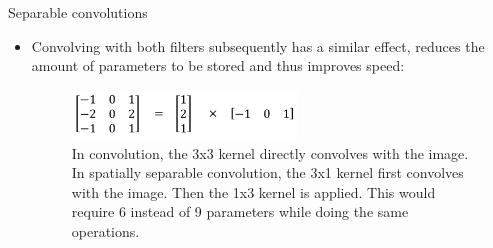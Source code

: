 \begin{vbframe}{Separable convolutions}
\begin{itemize}
         \item Convolving with both filters subsequently has a similar effect, reduces the amount of parameters to be stored and thus improves speed:
              \begin{figure}
         \centering
         \includegraphics[width=6cm]{plots/05_conv_variations/separable/seprablematrix.png}
         \caption{In convolution, the 3x3 kernel directly convolves with the image. In spatially separable convolution, the 3x1 kernel first convolves with the image. Then the 1x3 kernel is applied. This would require 6 instead of 9 parameters while doing the same operations.}
     \end{figure}
     \end{itemize}
 \end{vbframe}

